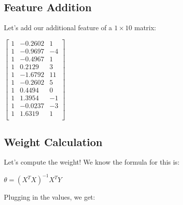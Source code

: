 \documentclass[12pt]{article}
\begin{document}
\subsection{Feature Addition}
\noindent
Let's add our additional feature of a $1 \times 10$ matrix:

\begin{center}
    $\begin{bmatrix}
        1 & -0.2602 & 1\\
        1 & -0.9697 & -4\\
        1 & -0.4967 & 1\\
        1 & 0.2129 & 3\\
        1 & -1.6792 & 11\\
        1 & -0.2602 & 5\\
        1 & 0.4494 & 0\\
        1 & 1.3954 & -1\\
        1 & -0.0237 & -3\\
        1 & 1.6319 & 1\\
    \end{bmatrix}$
\end{center}

\newpage
\subsection{Weight Calculation}
\noindent
Let's compute the weight! We know the formula for this is:
\begin{center}
    $ \theta = \left(X^{T} X\right)^{-1}X^{T}Y $
\end{center}

\noindent
Plugging in the values, we get:
\end{document}
